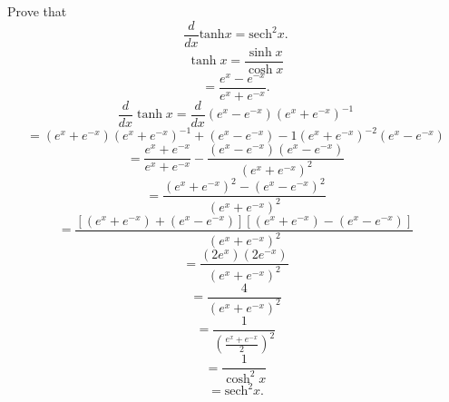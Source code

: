Prove that
\[
\frac{d}{dx}\text{tanh}x = \text{sech}^2x.
\]
\newline
\[
\tanh x = \frac{\sinh x}{\cosh x}
\]
\[
= \frac{e^x -e^{-x}}{e^x+e^{-x}}.
\]
\[
\frac{d}{dx}\tanh x = \frac{d}{dx}(e^x-e^{-x})(e^x+e^{-x})^{-1}
\]
\[
= (e^x +e^{-x})(e^x+e^{-x})^{-1} + (e^x-e^{-x})-1(e^x +e^{-x})^{-2}(e^{x} -e^{-x})
\]
\[
=\frac{e^x + e^{-x}}{e^x + e^{-x}} - \frac{(e^x-e^{-x})(e^x-e^{-x})}{(e^x+e^{-x})^2}
\]
\[
=\frac{(e^x+e^{-x})^2 -(e^x-e^{-x})^2}{(e^x+e^{-x})^2}
\]
\[
= \frac{[(e^x + e^{-x}) + (e^x-e^{-x})][(e^x+e^{-x})-(e^x-e^{-x})]}{(e^x+e^{-x})^2}
\]
\[
= \frac{(2e^x)(2e^{-x})}{(e^x+e^{-x})^2}
\]
\[
= \frac{4}{(e^{x}+e^{-x})^2}
\]
\[
= \frac{1}{(\frac{e^x+e^{-x}}{2})^2}
\]
\[
= \frac{1}{\cosh^2x}
\]
\[
= \text{sech}^2x.
\]